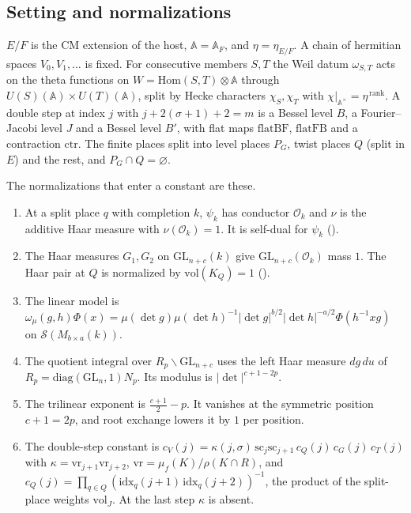 \documentclass[11pt]{article}
\newcommand{\GL}{\mathrm{GL}}
\newcommand{\Sch}{\mathcal S}
\begin{document}
\subsection{Setting and normalizations}

$E/F$ is the CM extension of the host, $\mathbb A=\mathbb A_F$, and $\eta=\eta_{E/F}$. A chain of hermitian spaces $V_0,V_1,\dots$ is fixed. For consecutive members $S,T$ the Weil datum $\omega_{S,T}$ acts on the theta functions on $W=\mathrm{Hom}(S,T)\otimes\mathbb A$ through $U(S)(\mathbb A)\times U(T)(\mathbb A)$, split by Hecke characters $\chi_S,\chi_T$ with $\chi|_{\mathbb A^\times}=\eta^{\,\mathrm{rank}}$. A double step at index $j$ with $j+2(\sigma+1)+2=m$ is a Bessel level $B$, a Fourier--Jacobi level $J$ and a Bessel level $B'$, with flat maps $\mathrm{flatBF}$, $\mathrm{flatFB}$ and a contraction $\mathrm{ctr}$. The finite places split into level places $P_G$, twist places $Q$ (split in $E$) and the rest, and $P_G\cap Q=\varnothing$.

The normalizations that enter a constant are these.
\begin{enumerate}[label=(N\arabic*),leftmargin=*,itemsep=2pt]
\item At a split place $q$ with completion $k$, $\psi_k$ has conductor $\mathcal O_k$ and $\nu$ is the additive Haar measure with $\nu(\mathcal O_k)=1$. It is self-dual for $\psi_k$ ().
\item The Haar measures $G_1,G_2$ on $\GL_{n+c}(k)$ give $\GL_{n+c}(\mathcal O_k)$ mass $1$. The Haar pair at $Q$ is normalized by $\mathrm{vol}(K_Q)=1$ ().
\item The linear model is $\omega_\mu(g,h)\Phi(x)=\mu(\det g)\mu(\det h)^{-1}\lvert\det g\rvert^{b/2}\lvert\det h\rvert^{-a/2}\Phi(h^{-1}xg)$ on $\Sch(M_{b\times a}(k))$.
\item The quotient integral over $R_p\backslash\GL_{n+c}$ uses the left Haar measure $dg\,du$ of $R_p=\mathrm{diag}(\GL_n,1)N_p$. Its modulus is $\lvert\det\rvert^{c+1-2p}$.
\item The trilinear exponent is $\frac{c+1}{2}-p$. It vanishes at the symmetric position $c+1=2p$, and root exchange lowers it by $1$ per position.
\item The double-step constant is $c_V(j)=\kappa(j,\sigma)\,\mathrm{sc}_j\mathrm{sc}_{j+1}\,c_Q(j)\,c_G(j)\,c_T(j)$ with $\kappa=\mathrm{vr}_{j+1}\mathrm{vr}_{j+2}$, $\mathrm{vr}=\mu_f(K)/\rho(K\cap R)$, and $c_Q(j)=\prod_{q\in Q}(\mathrm{idx}_q(j+1)\,\mathrm{idx}_q(j+2))^{-1}$, the product of the split-place weights $\mathrm{vol}_J$. At the last step $\kappa$ is absent.
\end{enumerate}
\end{document}
